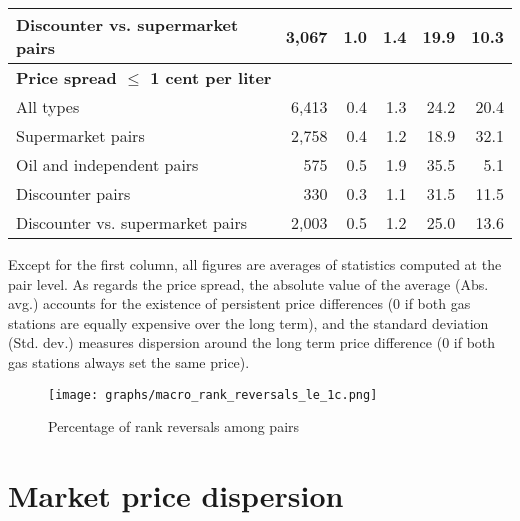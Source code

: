 \documentclass[english]{article}
\begin{document}
\begin{table}[H]
\begin{threeparttable}
\begin{tabular}{lrrrrr}
Discounter vs. supermarket pairs & 3,067 & 1.0   & 1.4   & 19.9  & 10.3 \\
\hline
\multicolumn{2}{l}{\textbf{Price spread $\le$ 1 cent per liter}} &       &       &       &  \\
All types & 6,413 & 0.4   & 1.3   & 24.2  & 20.4 \\
Supermarket pairs & 2,758 & 0.4   & 1.2   & 18.9  & 32.1 \\
Oil and independent pairs & 575   & 0.5   & 1.9   & 35.5  & 5.1 \\
Discounter pairs & 330   & 0.3   & 1.1   & 31.5  & 11.5 \\
Discounter vs. supermarket pairs & 2,003 & 0.5   & 1.2   & 25.0  & 13.6 \\
\hline
\hline
\end{tabular}
\begin{tablenotes}
			\small
      \item Except for the first column, all figures are averages of statistics computed at the pair level. As regards the price spread, the absolute value of the average (Abs. avg.) accounts for the existence of persistent price differences (0 if both gas stations are equally expensive over the long term), and the standard deviation (Std. dev.) measures dispersion around the long term price difference (0 if both gas stations always set the same price).
\end{tablenotes}
\end{threeparttable}
\end{table}

\begin{figure}[H]
    \caption{Percentage of rank reversals among pairs}
    \label{fig:pct_reversed_pairs}
	\centering
		\texttt{[image: graphs/macro\_rank\_reversals\_le\_1c.png]}
\end{figure}

\section{Market price dispersion}
\end{document}
